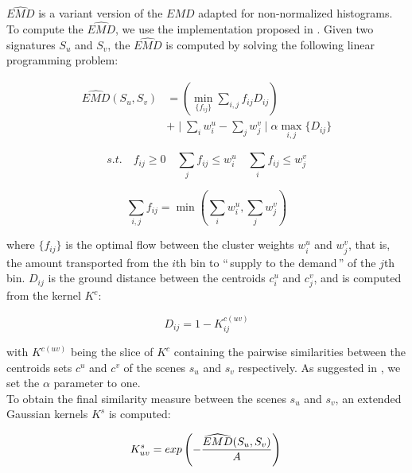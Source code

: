\documentclass[journal]{IEEEtran}
\begin{document}
$\widehat{EMD}$ is a variant version of the $EMD$ adapted for non-normalized histograms. To compute the $\widehat{EMD}$, we use the implementation proposed in \cite{pele2009fast}. Given two signatures $S_u$ and $S_v$, the $\widehat{EMD}$ is computed by solving the following linear programming problem:

\begin{equation}
\begin{split}
\widehat{EMD}(S_u,S_v) &=( \min\limits_{\lbrace f_{ij}\rbrace} \sum\limits_{i,j} f_{ij}D_{ij} )  \\ 
&+ \mid \sum\limits_{i} w_i^u - \sum\limits_{j} w_j^v  \mid \alpha \max\limits_{i,j}\lbrace  D_{ij}\rbrace
\end{split}
\end{equation}

\begin{equation*}
s.t. \quad f_{ij}\geq0 \quad \sum\limits_{j} f_{ij} \leq w_i^u \quad \sum\limits_{i} f_{ij} \leq w_j^v 
\end{equation*}

\begin{equation*}
\sum\limits_{i,j}f_{ij} = \min( \sum\limits_{i} w_i^u ,\sum\limits_{j} w_j^v )
\end{equation*}

where $\lbrace f_{ij} \rbrace$ is the optimal flow between the cluster weights $w_i^u$ and $w_j^v$, that is, the amount transported from the $i$th bin to ``\,supply to the demand\,'' of the $j$th bin. $D_{ij}$ is the ground distance between the centroids $c_i^u$ and $c_j^v$, and is computed from the kernel $K^c$:

\begin{equation*}
D_{ij}=1-K^{c(uv)}_{ij}
\end{equation*}

with $K^{c(uv)}$ being the slice of $K^{c}$ containing the pairwise similarities between the centroids sets $c^u$ and $c^v$ of the scenes $s_u$ and $s_v$ respectively. As suggested in \cite{pele2009fast}, we set the $\alpha$ parameter to one.\\

To obtain the final similarity measure between the scenes $s_u$ and $s_v$, an extended Gaussian kernels $K^s$ \cite{chapelle1999support,jing2003support} is computed:

\begin{equation}
\label{eq:ks}
K_{uv}^s = exp\left( - \dfrac{\widehat{EMD}(S_u,S_v)}{A} \right) \\
\end{equation}
\end{document}

